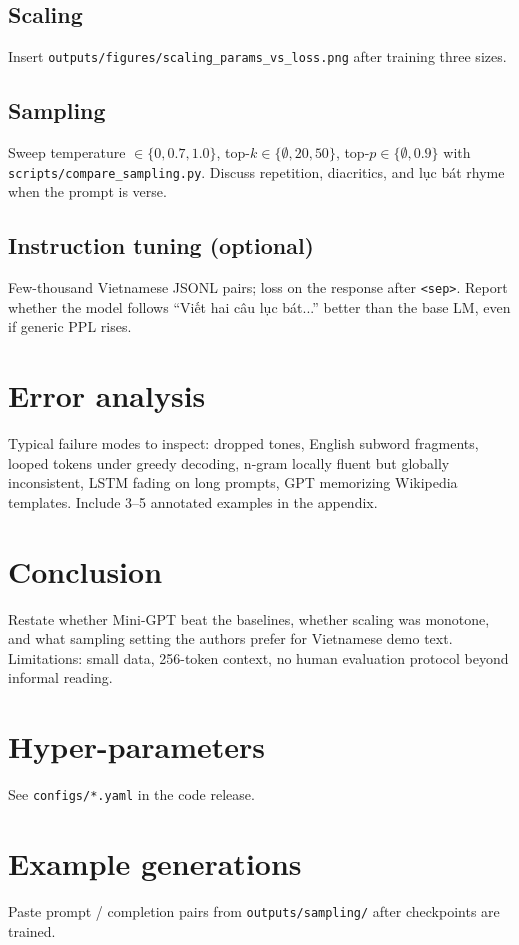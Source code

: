\documentclass[11pt]{article}
\begin{document}
\subsection{Scaling}

Insert \texttt{outputs/figures/scaling\_params\_vs\_loss.png} after training three sizes.

\subsection{Sampling}

Sweep temperature $\in \{0, 0.7, 1.0\}$, top-$k \in \{\emptyset, 20, 50\}$, top-$p \in \{\emptyset, 0.9\}$ with \texttt{scripts/compare\_sampling.py}. Discuss repetition, diacritics, and lục bát rhyme when the prompt is verse.

\subsection{Instruction tuning (optional)}

Few-thousand Vietnamese JSONL pairs; loss on the response after \texttt{<sep>}. Report whether the model follows ``Viết hai câu lục bát...'' better than the base LM, even if generic PPL rises.

\section{Error analysis}

Typical failure modes to inspect: dropped tones, English subword fragments, looped tokens under greedy decoding, n-gram locally fluent but globally inconsistent, LSTM fading on long prompts, GPT memorizing Wikipedia templates. Include 3--5 annotated examples in the appendix.

\section{Conclusion}

Restate whether Mini-GPT beat the baselines, whether scaling was monotone, and what sampling setting the authors prefer for Vietnamese demo text. Limitations: small data, 256-token context, no human evaluation protocol beyond informal reading.



\appendix
\section{Hyper-parameters}
See \texttt{configs/*.yaml} in the code release.

\section{Example generations}
Paste prompt / completion pairs from \texttt{outputs/sampling/} after checkpoints are trained.
\end{document}
